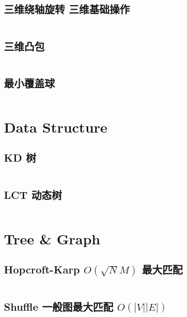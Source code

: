 \documentclass[titlepage, a4paper]{article}
\begin{document}
\begin{multicols}{2}
\begin{spacing}{0.6}
				\subsection{三维绕轴旋转 三维基础操作}
				\inputminted{cpp}{src/Geometry/三维几何.cpp}
				\subsection{三维凸包}
				\inputminted{cpp}{src/Geometry/三维凸包.cpp}
				\subsection{最小覆盖球}
				\inputminted{cpp}{src/Geometry/最小覆盖球.cpp}
				
			
			\section{Data Structure}
				\subsection{KD 树}
				\inputminted{cpp}{src/DataStructure/KD tree.cpp}
				\subsection{LCT 动态树}
				\inputminted{cpp}{src/DataStructure/LCT.cpp}
				
			\section{Tree \& Graph}
				\subsection{Hopcroft-Karp $O(\sqrt{N}M)$ 最大匹配}
				\inputminted{cpp}{src/TreeandGraph/Hopcroft.cpp}
				\subsection{Shuffle 一般图最大匹配 $O(|V| |E|)$}
				\inputminted{cpp}{src/TreeandGraph/一般图最大匹配-shuffle.cpp}

\end{spacing}
\end{multicols}
\end{document}

